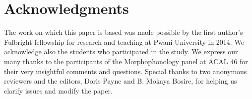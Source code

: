 \documentclass[output=paper]{langsci/langscibook}
\begin{document}
\section*{Acknowledgments }

The work on which this paper is based was made possible by the first author’s Fulbright fellowship for research and teaching at Pwani University in 2014. We acknowledge also the students who participated in the study. We express our many thanks to the participants of the Morphophonology panel at ACAL 46 for their very insightful comments and questions. Special thanks to two anonymous reviewers and the editors, Doris Payne and B. Mokaya Bosire, for helping us clarify issues and modify the paper. 

\printbibliography[heading=subbibliography,notkeyword=this]
\end{document}
